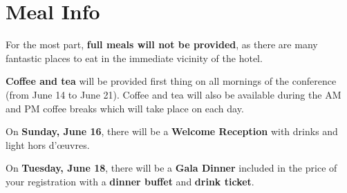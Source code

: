\setheaders{}{}
\section{Meal Info}{}

For the most part, \textbf{full meals will not be provided}, as there are many fantastic places to eat in the immediate vicinity of the hotel.

\textbf{Coffee and tea} will be provided first thing on all mornings of the conference (from June 14 to June 21). 
Coffee and tea will also be available during the AM and PM coffee breaks which will take place on each day.

On \textbf{Sunday, June 16}, there will be a \textbf{Welcome Reception} with drinks and light hors d'\oe{}uvres.

On \textbf{Tuesday, June 18}, there will be a \textbf{Gala Dinner} included in the price of your registration with a \textbf{dinner buffet} and \textbf{drink ticket}.

